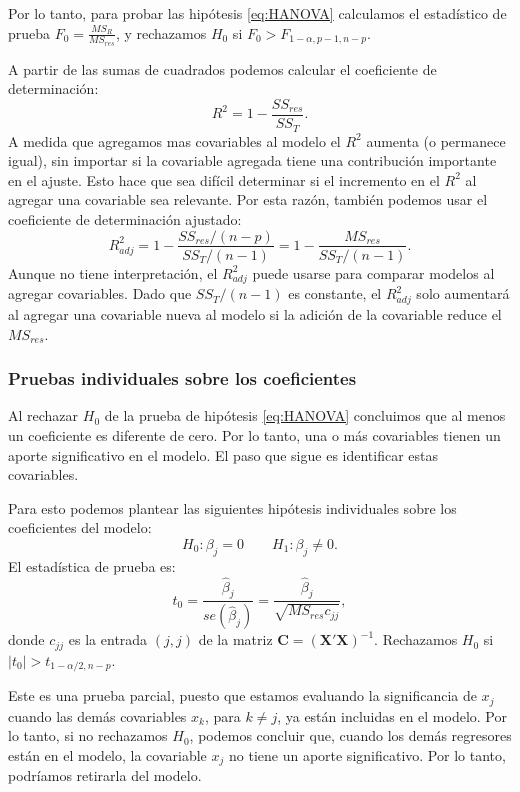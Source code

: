 \documentclass[
]{article}
\begin{document}
Por lo tanto, para probar las hipótesis \eqref{eq:HANOVA} calculamos el estadístico de prueba \(F_{0} = \frac{MS_{R}}{MS_{res}}\), y rechazamos \(H_{0}\) si \(F_{0} > F_{1-\alpha,p-1,n-p}\).

A partir de las sumas de cuadrados podemos calcular el coeficiente de determinación:
\[
R^{2} = 1-\frac{SS_{res}}{SS_{T}}.
\]
A medida que agregamos mas covariables al modelo el \(R^{2}\) aumenta (o permanece igual), sin importar si la covariable agregada tiene una contribución importante en el ajuste. Esto hace que sea difícil determinar si el incremento en el \(R^{2}\) al agregar una covariable sea relevante. Por esta razón, también podemos usar el coeficiente de determinación ajustado:
\[
R^{2}_{adj} = 1-\frac{SS_{res}/(n-p)}{SS_{T}/(n-1)} = 1 - \frac{MS_{res}}{SS_T/(n-1)}.
\]
Aunque no tiene interpretación, el \(R^{2}_{adj}\) puede usarse para comparar modelos al agregar covariables. Dado que \(SS_{T}/(n-1)\) es constante, el \(R^{2}_{adj}\) solo aumentará al agregar una covariable nueva al modelo si la adición de la covariable reduce el \(MS_{res}\).

\hypertarget{pruebas-individuales-sobre-los-coeficientes}{%
\subsubsection{Pruebas individuales sobre los coeficientes}\label{pruebas-individuales-sobre-los-coeficientes}}

Al rechazar \(H_{0}\) de la prueba de hipótesis \eqref{eq:HANOVA} concluimos que al menos un coeficiente es diferente de cero. Por lo tanto, una o más covariables tienen un aporte significativo en el modelo. El paso que sigue es identificar estas covariables.

Para esto podemos plantear las siguientes hipótesis individuales sobre los coeficientes del modelo:
\[
H_{0}: \beta_{j} = 0 \qquad H_{1}: \beta_{j} \neq 0.
\]
El estadística de prueba es:
\[
t_{0} = \frac{\widehat{\beta}_{j}}{se(\widehat{\beta}_{j})} = \frac{\widehat{\beta}_{j}}{\sqrt{MS_{res}c_{jj}}},
\]
donde \(c_{jj}\) es la entrada \((j,j)\) de la matriz \(\boldsymbol C= (\boldsymbol X'\boldsymbol X)^{-1}\). Rechazamos \(H_{0}\) si \(|t_{0}| > t_{1-\alpha/2,n-p}\).

Este es una prueba parcial, puesto que estamos evaluando la significancia de \(x_{j}\) cuando las demás covariables \(x_{k}\), para \(k\neq j\), ya están incluidas en el modelo. Por lo tanto, si no rechazamos \(H_{0}\), podemos concluir que, cuando los demás regresores están en el modelo, la covariable \(x_{j}\) no tiene un aporte significativo. Por lo tanto, podríamos retirarla del modelo.
\end{document}
